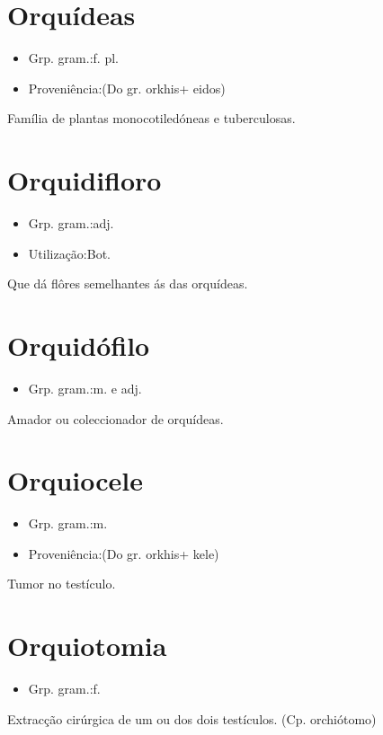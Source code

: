 \section{Orquídeas}
\begin{itemize}
\item {Grp. gram.:f. pl.}
\end{itemize}
\begin{itemize}
\item {Proveniência:(Do gr. \textunderscore orkhis\textunderscore  + \textunderscore eidos\textunderscore )}
\end{itemize}
Família de plantas monocotiledóneas e tuberculosas.
\section{Orquidifloro}
\begin{itemize}
\item {Grp. gram.:adj.}
\end{itemize}
\begin{itemize}
\item {Utilização:Bot.}
\end{itemize}
Que dá flôres semelhantes ás das orquídeas.
\section{Orquidófilo}
\begin{itemize}
\item {Grp. gram.:m.  e  adj.}
\end{itemize}
Amador ou coleccionador de orquídeas.
\section{Orquiocele}
\begin{itemize}
\item {Grp. gram.:m.}
\end{itemize}
\begin{itemize}
\item {Proveniência:(Do gr. \textunderscore orkhis\textunderscore  + \textunderscore kele\textunderscore )}
\end{itemize}
Tumor no testículo.
\section{Orquiotomia}
\begin{itemize}
\item {Grp. gram.:f.}
\end{itemize}
Extracção cirúrgica de um ou dos dois testículos.
(Cp. \textunderscore orchiótomo\textunderscore )
